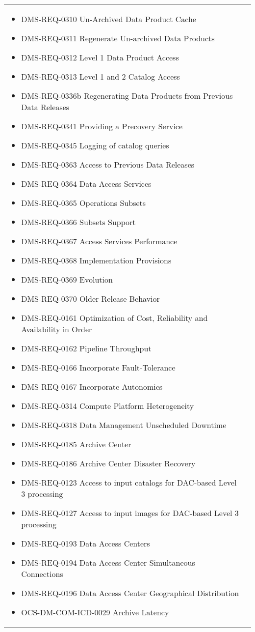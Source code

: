 \begin{xtabular}{lp{0.7\textwidth}}
\begin{itemize}
\item DMS-REQ-0310 Un-Archived Data Product Cache
\item DMS-REQ-0311 Regenerate Un-archived Data Products
\item DMS-REQ-0312 Level 1 Data Product Access
\item DMS-REQ-0313 Level 1 and 2 Catalog Access
\item DMS-REQ-0336b Regenerating Data Products from Previous Data Releases
\item DMS-REQ-0341 Providing a Precovery Service
\item DMS-REQ-0345 Logging of catalog queries
\item DMS-REQ-0363 Access to Previous Data Releases
\item DMS-REQ-0364 Data Access Services
\item DMS-REQ-0365 Operations Subsets
\item DMS-REQ-0366 Subsets Support
\item DMS-REQ-0367 Access Services Performance
\item DMS-REQ-0368 Implementation Provisions
\item DMS-REQ-0369 Evolution
\item DMS-REQ-0370 Older Release Behavior
\item DMS-REQ-0161 Optimization of Cost, Reliability and Availability in Order
\item DMS-REQ-0162 Pipeline Throughput
\item DMS-REQ-0166 Incorporate Fault-Tolerance
\item DMS-REQ-0167 Incorporate Autonomics
\item DMS-REQ-0314 Compute Platform Heterogeneity
\item DMS-REQ-0318 Data Management Unscheduled Downtime
\item DMS-REQ-0185 Archive Center
\item DMS-REQ-0186 Archive Center Disaster Recovery
\item DMS-REQ-0123 Access to input catalogs for DAC-based Level 3 processing
\item DMS-REQ-0127 Access to input images for DAC-based Level 3 processing
\item DMS-REQ-0193 Data Access Centers
\item DMS-REQ-0194 Data Access Center Simultaneous Connections
\item DMS-REQ-0196 Data Access Center Geographical Distribution
\item OCS-DM-COM-ICD-0029 Archive Latency

\end{itemize}
\end{xtabular}
